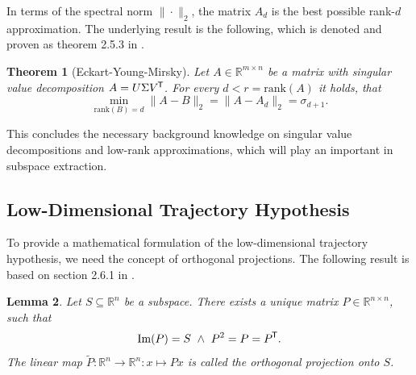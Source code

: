 \documentclass[11pt, a4paper]{article}
\newtheorem{theorem}{Theorem}[section]
\newtheorem{lemma}[theorem]{Lemma}
\newcommand{\R}{\mathbb{R}}
\newcommand*{\tr}{^{\mkern-1.5mu\mathsf{T}}}
\begin{document}
In terms of the spectral norm $\| \cdot \|_2$, the matrix $A_d$ is the best possible rank-$d$ approximation. The underlying result is the following, which is denoted and proven as theorem 2.5.3 in \cite{SVD}.

\begin{theorem}[Eckart-Young-Mirsky] \label{thm:eym}
Let $A \in \R^{m \times n}$ be a matrix with singular value decomposition $A= U \Sigma V\tr $. For every $d < r = \text{rank}(A)$ it holds, that
\[ \min_{\text{rank}(B)=d} \big \| A-B \big \|_2 = \big \| A - A_d \big \|_2 = \sigma_{d+1}. \]
\end{theorem}

This concludes the necessary background knowledge on singular value decompositions and low-rank approximations, which will play an important in subspace extraction.

\subsection{Low-Dimensional Trajectory Hypothesis}

To provide a mathematical formulation of the low-dimensional trajectory hypothesis, we need the concept of orthogonal projections. The following result is based on section 2.6.1 in \cite{SVD}.

\begin{lemma} \label{lem:orthProjection}
Let $S \subseteq \R^n$ be a subspace. There exists a unique matrix $P \in \R^{n \times n}$, such that
\[ \text{Im}(P) = S \ \wedge \ P^2 = P = P\tr . \]
The linear map $\tilde{P} : \R^n \to \R^n : x \mapsto Px$ is called the orthogonal projection onto $S$.
\end{lemma}
\end{document}
